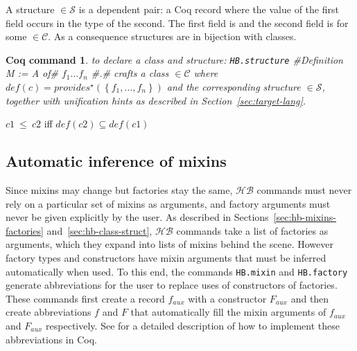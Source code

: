\documentclass[a4paper,UKenglish,cleveref, autoref]{lipics-v2019}
\newcommand{\HB}{\ensuremath{\mathcal{HB}}}
\newcommand{\mixin}{mixin}
\newcommand{\mixins}{mixins}
\newcommand{\factory}{factory}
\newcommand{\factories}{factories}
\newcommand{\phantterms}{abbreviations}
\newcommand{\C}{\ensuremath{\mathcal{C}}}
\newcommand{\classes}{classes}
\newcommand{\cdef}{\ensuremath{\mathit{def}}}
\newcommand{\Str}{\ensuremath{\mathcal{S}}}
\newcommand{\structure}{structure}
\newcommand{\structures}{structures}
\newcommand{\issubclass}{\ensuremath{\leq}}
\newcommand{\subclass}{subclass}
\newcommand{\provides}{\ensuremath{\mathit{provides}}}
\newcommand{\set}[1]{\left\{#1\right\}}
\newcommand{\enum}[2]{\ensuremath{\set{#1,\ldots,#2}}}
\newcommand{\hbmixin}{{\tt\color{dkgreen}HB.mixin}}
\newcommand{\hbfactory}{{\tt\color{dkgreen}HB.factory}}
\newcommand{\hbstructure}{{\tt\color{dkgreen}HB.structure}}
\theoremstyle{implem}
\theoremstyle{implem}
\theoremstyle{command}
\newtheorem*{command}{Coq command}
\begin{document}
\begin{definition}[\Str{} Structure]
A \structure{}  \(\in \Str{}\) is a dependent pair: a Coq record where
the value of the first field occurs in the type of the second.
The first field is  and the second field is
 for some  \(\in \C{}\).
As a consequence \structures{} are in bijection with \classes{}.
\end{definition}


\begin{command} to declare a class and structure:
  \hbstructure{} \coq#Definition M := { A of# \(f_1 \ldots f_n\) \coq#}.#
  crafts a class  $\in \C{}$ where
  $\cdef{}(c) = \provides{}^\star\left(\enum{f_1}{f_n}\right) $ and the
  corresponding structure  $\in \Str{}$, together with
  unification hints as described in Section~\ref{sec:target-lang}.
\end{command}


\begin{definition}[\issubclass{} \(\in \C{}\times\C{}\), \subclass{}]\label{def:subclass}
  \(c1~\issubclass{}~c2\) iff \(\cdef{}(c2) \subseteq \cdef{}(c1)\)
  \end{definition}

\subsection{Automatic inference of \mixins{}}
\label{sec:autom-infer-mixins}

Since \mixins{} may change but \factories{} stay the same, \HB{}
commands must never rely on a particular set of \mixins{} as
arguments, and \factory{} arguments must never be given explicitly by
the user. As described in Sections~\ref{sec:hb-mixins-factories}
and~\ref{sec:hb-class-struct}, \HB{} commands take a list of
\factories{} as arguments, which they expand into lists of \mixins{}
behind the scene. However \factory{} types and constructors have
\mixin{} arguments that must be inferred automatically when used. To
this end, the commands \hbmixin{} and \hbfactory{} generate
\phantterms{} for the user to replace uses of constructors of \factories{}.
These commands first create a record \(f_{aux}\) with a
constructor \(F_{aux}\) and then create abbreviations \(f\) and \(F\)
that automatically fill the mixin arguments of \(f_{aux}\) and \(F_{aux}\)
respectively.
See \cite[Section 7]{DBLP:conf/itp/MahboubiT13} for a detailed description
of how to implement these abbreviations in Coq.
\end{document}
